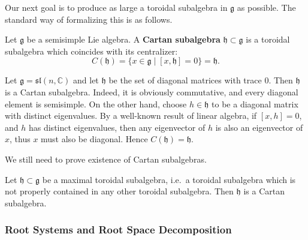 \documentclass[12pt]{article}
\begin{document}
Our next goal is to produce as large a toroidal subalgebra in $\mathfrak g$ as possible. The standard way of formalizing this is as follows.

\begin{definition}
    Let $\mathfrak g$ be a semisimple Lie algebra. A \textbf{Cartan subalgebra} $\mathfrak h \subset \mathfrak g$ is a toroidal subalgebra which coincides with its centralizer:
    \[
        C(\mathfrak h) = \{ x \in \mathfrak g \mid [x,\mathfrak h] = 0 \} = \mathfrak h.
    \]
\end{definition}


\begin{example}
    Let $\mathfrak g = \mathfrak{sl}(n,\mathbb C)$ and let $\mathfrak h$ be the set of diagonal matrices with trace $0$. Then $\mathfrak h$ is a Cartan subalgebra. Indeed, it is obviously commutative, and every diagonal element is semisimple. On the other hand, choose $h \in \mathfrak h$ to be a diagonal matrix with distinct eigenvalues. By a well-known result of linear algebra, if $[x,h] = 0$, and $h$ has distinct eigenvalues, then any eigenvector of $h$ is also an eigenvector of $x$, thus $x$ must also be diagonal. Hence $C(\mathfrak h) = \mathfrak h$.
\end{example}

We still need to prove existence of Cartan subalgebras.

\begin{theorem}
    Let $\mathfrak h \subset \mathfrak g$ be a maximal toroidal subalgebra, i.e.\ a toroidal subalgebra which is not properly contained in any other toroidal subalgebra. Then $\mathfrak h$ is a Cartan subalgebra.
\end{theorem}
\subsubsection{Root Systems and Root Space Decomposition}
\end{document}
